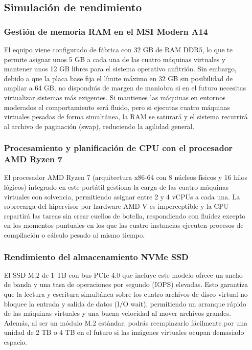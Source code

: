 \documentclass[11.5pt]{article}
\begin{document}
	\subsection{Simulación de rendimiento}
	
	\subsubsection*{Gestión de memoria RAM en el MSI Modern A14}
	
	El equipo viene configurado de fábrica con 32 GB de RAM DDR5, lo que te permite asignar unos 5 GB a cada una de las cuatro máquinas virtuales y mantener unos 12 GB libres para el sistema operativo anfitrión. Sin embargo, debido a que la placa base fija el límite máximo en 32 GB sin posibilidad de ampliar a 64 GB, no dispondrás de margen de maniobra si en el futuro necesitas virtualizar sistemas más exigentes. Si mantienes las máquinas en entornos moderados el comportamiento será fluido, pero si ejecutas cuatro máquinas virtuales pesadas de forma simultánea, la RAM se saturará y el sistema recurrirá al archivo de paginación (swap), reduciendo la agilidad general.
	
	\subsubsection*{Procesamiento y planificación de CPU con el procesador AMD Ryzen 7}
	
	El procesador AMD Ryzen 7 (arquitectura x86-64 con 8 núcleos físicos y 16 hilos lógicos) integrado en este portátil gestiona la carga de las cuatro máquinas virtuales con solvencia, permitiendo asignar entre 2 y 4 vCPUs a cada una. La sobrecarga del hipervisor por hardware AMD-V es imperceptible y la CPU repartirá las tareas sin crear cuellos de botella, respondiendo con fluidez excepto en los momentos puntuales en los que las cuatro instancias ejecuten procesos de compilación o cálculo pesado al mismo tiempo.
	
	\subsubsection*{Rendimiento del almacenamiento NVMe SSD}
	
	El SSD M.2 de 1 TB con bus PCIe 4.0 que incluye este modelo ofrece un ancho de banda y una tasa de operaciones por segundo (IOPS) elevadas. Esto garantiza que la lectura y escritura simultánea sobre los cuatro archivos de disco virtual no bloquee la entrada y salida de datos (I/O wait), permitiendo un arranque rápido de las máquinas virtuales y una buena velocidad al mover archivos grandes. Además, al ser un módulo M.2 estándar, podrás reemplazarlo fácilmente por una unidad de 2 TB o 4 TB en el futuro si las imágenes virtuales ocupan demasiado espacio.
	
\end{document}
